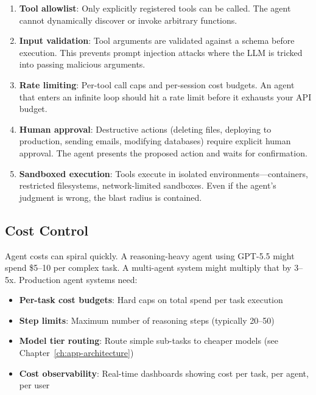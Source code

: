 \begin{enumerate}[leftmargin=*]
    \item \textbf{Tool allowlist}: Only explicitly registered tools can be called. The agent cannot dynamically discover or invoke arbitrary functions.
    
    \item \textbf{Input validation}: Tool arguments are validated against a schema before execution. This prevents prompt injection attacks where the LLM is tricked into passing malicious arguments.
    
    \item \textbf{Rate limiting}: Per-tool call caps and per-session cost budgets. An agent that enters an infinite loop should hit a rate limit before it exhausts your API budget.
    
    \item \textbf{Human approval}: Destructive actions (deleting files, deploying to production, sending emails, modifying databases) require explicit human approval. The agent presents the proposed action and waits for confirmation.
    
    \item \textbf{Sandboxed execution}: Tools execute in isolated environments---containers, restricted filesystems, network-limited sandboxes. Even if the agent's judgment is wrong, the blast radius is contained.
\end{enumerate}

\subsection{Cost Control}

Agent costs can spiral quickly. A reasoning-heavy agent using GPT-5.5 might spend \$5--10 per complex task. A multi-agent system might multiply that by 3--5x. Production agent systems need:

\begin{itemize}[leftmargin=*]
    \item \textbf{Per-task cost budgets}: Hard caps on total spend per task execution
    \item \textbf{Step limits}: Maximum number of reasoning steps (typically 20--50)
    \item \textbf{Model tier routing}: Route simple sub-tasks to cheaper models (see Chapter~\ref{ch:app-architecture})
    \item \textbf{Cost observability}: Real-time dashboards showing cost per task, per agent, per user
\end{itemize}

